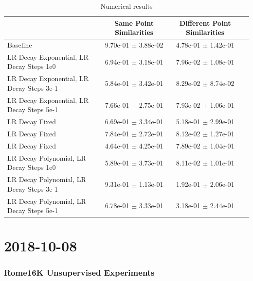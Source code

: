 \documentclass[a4paper]{article}
\newcommand{\DatestampYMD}[3]{\mbox{#1-#2-#3}}
\newcommand{\entry}[3]{\newpage\section*{\DatestampYMD{#1}{#2}{#3}} }
\begin{document}
\begin{table}[H]
  \caption{Numerical results}
      \begin{tabular}{|l|c|c|c|} \hline
                                      &  Same Point Similarities  &  Different Point Similarities  \\ \hline
Baseline   & 9.70e-01 $\pm$ 3.88e-02 & 4.78e-01 $\pm$ 1.42e-01 \\ \hline
LR Decay Exponential, LR Decay Steps 1e0 & 6.94e-01 $\pm$ 3.18e-01 & 7.96e-02 $\pm$ 1.08e-01 \\ \hline
LR Decay Exponential, LR Decay Steps 3e-1& 5.84e-01 $\pm$ 3.42e-01 & 8.29e-02 $\pm$ 8.74e-02 \\ \hline
LR Decay Exponential, LR Decay Steps 5e-1& 7.66e-01 $\pm$ 2.75e-01 & 7.93e-02 $\pm$ 1.06e-01 \\ \hline
LR Decay Fixed                  & 6.69e-01 $\pm$ 3.34e-01 & 5.18e-01 $\pm$ 2.99e-01 \\ \hline
LR Decay Fixed                   & 7.84e-01 $\pm$ 2.72e-01 & 8.12e-02 $\pm$ 1.27e-01 \\ \hline
LR Decay Fixed                   & 4.64e-01 $\pm$ 4.25e-01 & 7.89e-02 $\pm$ 1.04e-01 \\ \hline
LR Decay Polynomial, LR Decay Steps 1e0  & 5.89e-01 $\pm$ 3.73e-01 & 8.11e-02 $\pm$ 1.01e-01 \\ \hline
LR Decay Polynomial, LR Decay Steps 3e-1 & 9.31e-01 $\pm$ 1.13e-01 & 1.92e-01 $\pm$ 2.06e-01 \\ \hline
LR Decay Polynomial, LR Decay Steps 5e-1 & 6.78e-01 $\pm$ 3.33e-01 & 3.18e-01 $\pm$ 2.44e-01 \\ \hline
      \end{tabular}
      \label{fig:tab1}
\end{table}


\entry{2018}{10}{08}
\subsubsection*{Rome16K Unsupervised Experiments}
\end{document}
